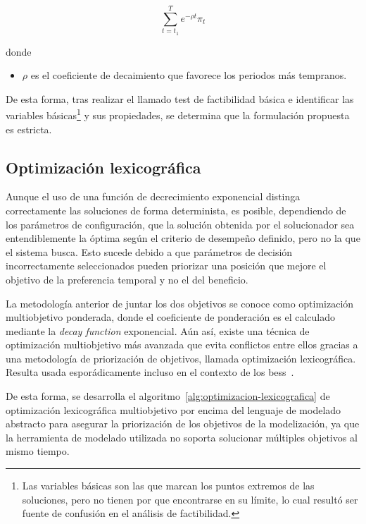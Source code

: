 \begin{samepage}

\begin{equation}
  \label{eq:exponential-decay}
    \sum_{t = t_{1}}^{T} e^{-\rho t} \pi_{t}
\end{equation}

  donde

  \begin{itemize}
    \item \( \rho \) es el coeficiente de decaimiento que favorece los periodos más tempranos.
  \end{itemize}

\end{samepage}

De esta forma, tras realizar el llamado test de factibilidad básica e identificar las variables básicas\footnote{Las variables básicas son las que marcan los puntos extremos de las soluciones, pero no tienen por que encontrarse en su límite, lo cual resultó ser fuente de confusión en el análisis de factibilidad.} y sus propiedades, se determina que la formulación propuesta es estricta.

\subsection{Optimización lexicográfica}
\label{makereference5.3.1}

Aunque el uso de una función de decrecimiento exponencial distinga correctamente las soluciones de forma determinista, es posible, dependiendo de los parámetros de configuración, que la solución obtenida por el solucionador sea entendiblemente la óptima según el criterio de desempeño definido, pero no la que el sistema busca. Esto sucede debido a que parámetros de decisión incorrectamente seleccionados pueden priorizar una posición que mejore el objetivo de la preferencia temporal y no el del beneficio.

La metodología anterior de juntar los dos objetivos se conoce como optimización multiobjetivo ponderada, donde el coeficiente de ponderación es el calculado mediante la \textit{decay function} exponencial. Aún así, existe una técnica de optimización multiobjetivo más avanzada que evita conflictos entre ellos gracias a una metodología de priorización de objetivos, llamada optimización lexicográfica. Resulta usada esporádicamente incluso en el contexto de los \gls{bess}~\cite{karimi2019multi}.

De esta forma, se desarrolla el algoritmo~\ref{alg:optimizacion-lexicografica} de optimización lexicográfica multiobjetivo por encima del lenguaje de modelado abstracto para asegurar la priorización de los objetivos de la modelización, ya que la herramienta de modelado utilizada no soporta solucionar múltiples objetivos al mismo tiempo.

